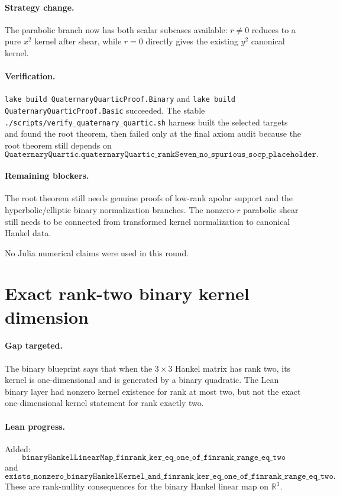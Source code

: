 \documentclass[11pt]{article}
\begin{document}
\paragraph{Strategy change.}
The parabolic branch now has both scalar subcases available: \(r\ne0\) reduces
to a pure \(x^2\) kernel after shear, while \(r=0\) directly gives the existing
\(y^2\) canonical kernel.

\paragraph{Verification.}
\texttt{lake build QuaternaryQuarticProof.Binary} and
\texttt{lake build QuaternaryQuarticProof.Basic} succeeded.  The stable
\texttt{./scripts/verify\_quaternary\_quartic.sh} harness built the selected
targets and found the root theorem, then failed only at the final axiom audit
because the root theorem still depends on
\[
\texttt{QuaternaryQuartic.quaternaryQuartic\_rankSeven\_no\_spurious\_socp\_placeholder}.
\]

\paragraph{Remaining blockers.}
The root theorem still needs genuine proofs of low-rank apolar support and the
hyperbolic/elliptic binary normalization branches.  The nonzero-\(r\)
parabolic shear still needs to be connected from transformed kernel
normalization to canonical Hankel data.

No Julia numerical claims were used in this round.

\section*{Exact rank-two binary kernel dimension}

\paragraph{Gap targeted.}
The binary blueprint says that when the \(3\times3\) Hankel matrix has rank
two, its kernel is one-dimensional and is generated by a binary quadratic.  The
Lean binary layer had nonzero kernel existence for rank at most two, but not
the exact one-dimensional kernel statement for rank exactly two.

\paragraph{Lean progress.}
Added:
\[
\texttt{binaryHankelLinearMap\_finrank\_ker\_eq\_one\_of\_finrank\_range\_eq\_two}
\]
and
\[
\texttt{exists\_nonzero\_binaryHankelKernel\_and\_finrank\_ker\_eq\_one\_of\_finrank\_range\_eq\_two}.
\]
These are rank-nullity consequences for the binary Hankel linear map on
\(\mathbb{R}^3\).
\end{document}
